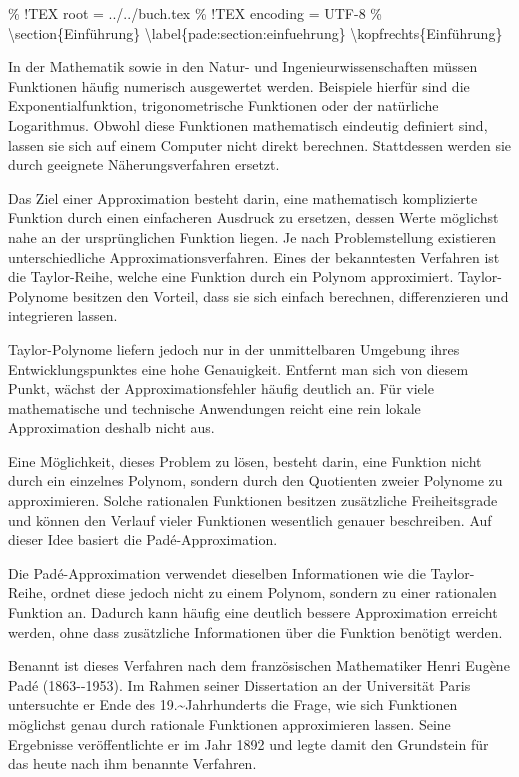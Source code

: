 \% !TEX root = ../../buch.tex \% !TEX encoding = UTF-8 \%
\textbackslash section\{Einführung\}
\textbackslash label\{pade:section:einfuehrung\}
\textbackslash kopfrechts\{Einführung\}

In der Mathematik sowie in den Natur- und Ingenieurwissenschaften müssen
Funktionen häufig numerisch ausgewertet werden. Beispiele hierfür sind
die Exponentialfunktion, trigonometrische Funktionen oder der natürliche
Logarithmus. Obwohl diese Funktionen mathematisch eindeutig definiert
sind, lassen sie sich auf einem Computer nicht direkt berechnen.
Stattdessen werden sie durch geeignete Näherungsverfahren ersetzt.

Das Ziel einer Approximation besteht darin, eine mathematisch
komplizierte Funktion durch einen einfacheren Ausdruck zu ersetzen,
dessen Werte möglichst nahe an der ursprünglichen Funktion liegen. Je
nach Problemstellung existieren unterschiedliche
Approximationsverfahren. Eines der bekanntesten Verfahren ist die
Taylor-Reihe, welche eine Funktion durch ein Polynom approximiert.
Taylor-Polynome besitzen den Vorteil, dass sie sich einfach berechnen,
differenzieren und integrieren lassen.

Taylor-Polynome liefern jedoch nur in der unmittelbaren Umgebung ihres
Entwicklungspunktes eine hohe Genauigkeit. Entfernt man sich von diesem
Punkt, wächst der Approximationsfehler häufig deutlich an. Für viele
mathematische und technische Anwendungen reicht eine rein lokale
Approximation deshalb nicht aus.

Eine Möglichkeit, dieses Problem zu lösen, besteht darin, eine Funktion
nicht durch ein einzelnes Polynom, sondern durch den Quotienten zweier
Polynome zu approximieren. Solche rationalen Funktionen besitzen
zusätzliche Freiheitsgrade und können den Verlauf vieler Funktionen
wesentlich genauer beschreiben. Auf dieser Idee basiert die
Padé-Approximation.

Die Padé-Approximation verwendet dieselben Informationen wie die
Taylor-Reihe, ordnet diese jedoch nicht zu einem Polynom, sondern zu
einer rationalen Funktion an. Dadurch kann häufig eine deutlich bessere
Approximation erreicht werden, ohne dass zusätzliche Informationen über
die Funktion benötigt werden.

Benannt ist dieses Verfahren nach dem französischen Mathematiker Henri
Eugène Padé (1863-\/-1953). Im Rahmen seiner Dissertation an der
Universität Paris untersuchte er Ende des
19.\textasciitilde Jahrhunderts die Frage, wie sich Funktionen möglichst
genau durch rationale Funktionen approximieren lassen. Seine Ergebnisse
veröffentlichte er im Jahr 1892 und legte damit den Grundstein für das
heute nach ihm benannte Verfahren.

